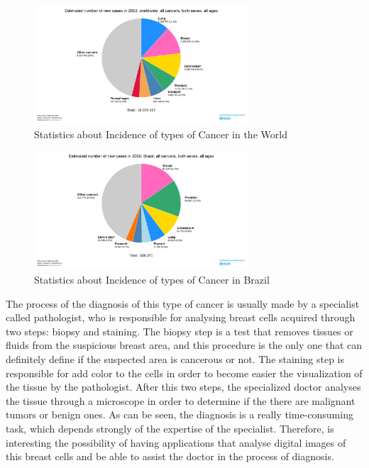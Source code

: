 \documentclass[conference]{IEEEtran}
\begin{document}
		\begin{figure}[h]
		    \centering
		    \includegraphics[width=8cm]{images/graphic1.png}
		    \caption{Statistics about Incidence of types of Cancer in the World \cite{GLOBOCAN}}
		    \label{fig:graphic1}
		\end{figure}
		
		\begin{figure}[h]
		    \centering
		    \includegraphics[width=8cm]{images/graphic2.png}
		    \caption{Statistics about Incidence of types of Cancer in Brazil \cite{GLOBOCAN}}
		    \label{fig:graphic2}
		\end{figure}
		
		\par The process of the diagnosis of this type of cancer is usually made by a specialist called pathologist, who is responsible for analysing breast cells acquired through two steps: biopsy and staining. The biopsy step is a test that removes tissues or fluids from the suspicious breast area, and this procedure is the only one that can definitely define if the suspected area is cancerous or not. The staining step is responsible for add color to the cells in order to become easier the visualization of the tissue by the pathologist. After this two steps, the specialized doctor analyses the tissue through a microscope in order to determine if the there are malignant tumors or benign ones. As can be seen, the diagnosis is a really time-consuming task, which depends strongly of the expertise of the specialist. Therefore, is interesting the possibility of having applications that analyse digital images of this breast cells and be able to assist the doctor in the process of diagnosis. 
		
\end{document}
